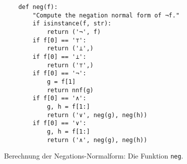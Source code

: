\begin{figure}[!ht]
  \centering
\begin{verbatim}
    def neg(f):
        "Compute the negation normal form of ¬f."
        if isinstance(f, str): 
            return ('¬', f)
        if f[0] == '⊤':
            return ('⊥',)
        if f[0] == '⊥':
            return ('⊤',)
        if f[0] == '¬':
            g = f[1]
            return nnf(g)
        if f[0] == '∧':
            g, h = f[1:]
            return ('∨', neg(g), neg(h))
        if f[0] == '∨':
            g, h = f[1:]
            return ('∧', neg(g), neg(h))
\end{verbatim}
\vspace*{-0.3cm}
  \caption{Berechnung der Negations-Normalform: Die Funktion \texttt{neg}.}
  \label{fig:neg}
\end{figure}


